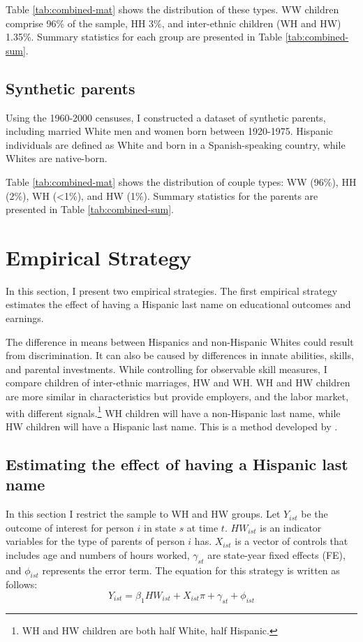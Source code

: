 \documentclass[a4paper,fleqn]{cas-sc}
\begin{document}
Table \ref{tab:combined-mat} shows the distribution of these types. WW children comprise 96\% of the sample, HH 3\%, and inter-ethnic children (WH and HW) 1.35\%. Summary statistics for each group are presented in Table \ref{tab:combined-sum}.

\subsection{Synthetic parents}

Using the 1960-2000 censuses, I constructed a dataset of synthetic parents, including married White men and women born between 1920-1975. Hispanic individuals are defined as White and born in a Spanish-speaking country, while Whites are native-born.

Table \ref{tab:combined-mat} shows the distribution of couple types: WW (96\%), HH (2\%), WH (<1\%), and HW (1\%). Summary statistics for the parents are presented in Table \ref{tab:combined-sum}.

\section{Empirical Strategy}\label{sec:emp_model}

In this section, I present two empirical strategies. The first empirical strategy estimates the effect of having a Hispanic last name on educational outcomes and earnings. 

The difference in means between Hispanics and non-Hispanic Whites could result from discrimination. It can also be caused by differences in innate abilities, skills, and parental investments. While controlling for observable skill measures, I compare children of inter-ethnic marriages, HW and WH. WH and HW children are more similar in characteristics but provide employers, and the labor market, with different signals.\footnote{WH and HW children are both half White, half Hispanic.} WH children will have a non-Hispanic last name, while HW children will have a Hispanic last name. This is a method developed by \citet{rubinstein2014pride}.

\subsection{Estimating the effect of having a Hispanic last name}

In this section I restrict the sample to WH and HW groups. Let $Y_{ist}$ be the outcome of interest for person $i$ in state $s$ at time $t$. $HW_{ist}$ is an indicator variables for the type of parents of person $i$ has. $X_{ist}$ is a vector of controls that includes age and numbers of hours worked, $\gamma_{st}$ are state-year fixed effects (FE), and $\phi_{ist}$ represents the error term. The equation for this strategy is written as follows:
\begin{equation} \label{eq:1a}
Y_{ist} = \beta_{1} HW_{ist} + X_{ist} \pi + \gamma_{st} + \phi_{ist}
\end{equation}
\end{document}
